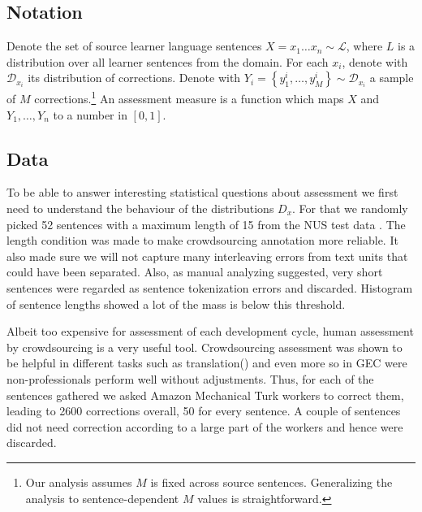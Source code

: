 \documentclass[english]{article}
\begin{document}

\subsection{Notation}

Denote the set of source learner language sentences $X=x_{1}\ldots x_n\sim \mathcal{L}$, where
$L$ is a distribution over all learner sentences from the domain. For each $x_i$, denote
with $\mathcal{D}_{x_i}$ its distribution of corrections. Denote with
$Y_i = \left\{y_{1}^{i},\ldots, y_{M}^{i}\right\} \sim \mathcal{D}_{x_i}$ a sample of
$M$ corrections.\footnote{Our analysis assumes $M$ is fixed across source sentences.
  Generalizing the analysis to sentence-dependent $M$ values is straightforward.}
An assessment measure is a function which maps $X$ and $Y_1,\ldots,Y_n$ to
a number in $[0,1]$.

\subsection{Data}
To be able to answer interesting statistical questions about assessment we first need to understand the behaviour of the distributions $D_x$. For that we randomly picked 52 sentences with a maximum length of 15 from the NUS test data \cite{dahlmeier2013building}. The length condition was made to make crowdsourcing annotation more reliable. It also made sure we will not capture many interleaving errors from text units that could have been separated. Also, as manual analyzing suggested, very short sentences were regarded as sentence tokenization errors and discarded. Histogram of sentence lengths showed a lot of the mass is below this threshold.

Albeit too expensive for assessment of each development cycle, human assessment by crowdsourcing is a very useful tool. Crowdsourcing assessment was shown to be helpful in different tasks such as translation(\cite{birch2016hume,zaidan2011crowdsourcing,post2012constructing}) and even more so in GEC \cite{madnani2011they} were non-professionals perform well without adjustments. Thus, for each of the sentences gathered we asked Amazon Mechanical Turk workers to correct them, leading to 2600 corrections overall, 50 for every sentence. A couple of sentences did not need correction according to a large part of the workers and hence were discarded.
\end{document}
